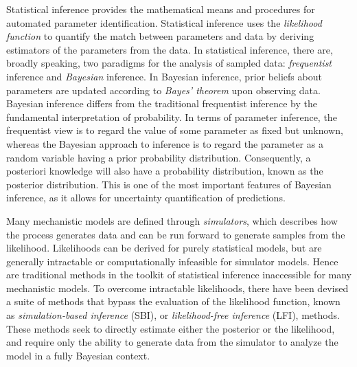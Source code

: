 Statistical inference provides the mathematical means and procedures for automated parameter identification. Statistical inference uses the \textit{likelihood function} to quantify the match between parameters and data by deriving estimators of the parameters from the data. In statistical inference, there are, broadly speaking, two paradigms for the analysis of sampled data: \textit{frequentist} inference and \textit{Bayesian} inference. In Bayesian inference, prior beliefs about parameters are updated according to \textit{Bayes' theorem} upon observing data. Bayesian inference differs from the traditional frequentist inference by the fundamental interpretation of probability. In terms of parameter inference, the frequentist view is to regard the value of some parameter as fixed but unknown, whereas the Bayesian approach to inference is to regard the parameter as a random variable having a prior probability distribution. Consequently, a posteriori knowledge will also have a probability distribution, known as the posterior distribution. This is one of the most important features of Bayesian inference, as it allows for uncertainty quantification of predictions. %

Many mechanistic models are defined through \textit{simulators}, which describes how the process generates data and can be run forward to generate samples from the likelihood. Likelihoods can be derived for purely statistical models, but are generally intractable or computationally infeasible for simulator models. Hence are traditional methods in the toolkit of statistical inference inaccessible for many mechanistic models. To overcome intractable likelihoods, there have been devised a suite of methods that bypass the evaluation of the likelihood function, known as \textit{simulation-based inference} (SBI), or \textit{likelihood-free inference} (LFI), methods. These methods seek to directly estimate either the posterior or the likelihood, and require only the ability to generate data from the simulator to analyze the model in a fully Bayesian context. 

